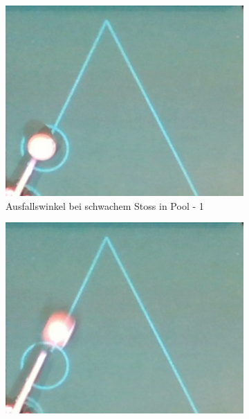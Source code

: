\begin{figure}[h!]
    \centering
    \begin{subfigure}[b]{0.2\textwidth}
        \centering
        \includegraphics[width=1.0\linewidth]{../common/04_results/resources/simulation/rebound_angle_slow_pool/00_rail_rebound_angle_slow_pool_01.png}
        \caption{Ausfallswinkel bei schwachem Stoss in Pool - 1}
        \label{fig:rebound_angle_slow_pool_1}
    \end{subfigure}
    \hfill
    \begin{subfigure}[b]{0.2\textwidth}
        \centering
        \includegraphics[width=1.0\linewidth]{../common/04_results/resources/simulation/rebound_angle_slow_pool/00_rail_rebound_angle_slow_pool_02.png}

\end{subfigure}
\end{figure}
